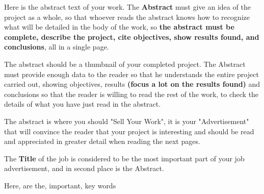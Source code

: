 \clearpage\newpage\pagebreak%
\pagestyle{plain}

\Abstract

Here is the abstract text of your work.
The {\bf Abstract} must give an idea of the project as a whole, so that whoever reads the abstract knows how to recognize what will be detailed in the body of the work, so {\bf the abstract must be complete, describe the project, cite objectives, show results found, and conclusions}, all in a single page.
    
The abstract should be a thumbnail of your completed project. The Abstract must provide enough data to the reader so that he understands the entire project carried out, showing objectives, results {\bf (focus a lot on the results found)} and conclusions so that the reader is willing to read the rest of the work, to check the details of what you have just read in the abstract.

The abstract is where you should "Sell Your Work", it is your "Advertisement" that will convince the reader that your project is interesting and should be read and appreciated in greater detail when reading the next pages.
    
The {\bf Title} of the job is considered to be the most important part of your job advertisement, and in second place is the Abstract.

\begin{keywords}
Here, are the, important, key words
\end{keywords}